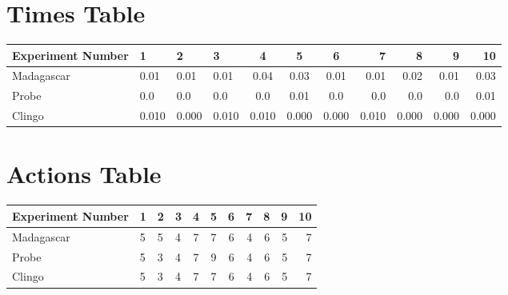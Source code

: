 \documentclass[8pt]{article}
\begin{document}
\begin{landscape}
\section{Times Table}\begin{tabular}{ | l | l | l | l | c | c | c | r | r | r | r | }\hline
Experiment Number & 1 & 2 & 3 & 4 & 5 & 6 & 7 & 8 & 9 & 10\\  \hline
Madagascar & 0.01 & 0.01 & 0.01 & 0.04 & 0.03 & 0.01 & 0.01 & 0.02 & 0.01 & 0.03\\  \hline
Probe & 0.0 & 0.0 & 0.0 & 0.0 & 0.01 & 0.0 & 0.0 & 0.0 & 0.0 & 0.01\\  \hline
Clingo & 0.010 & 0.000 & 0.010 & 0.010 & 0.000 & 0.000 & 0.010 & 0.000 & 0.000 & 0.000\\  \hline
\end{tabular}
\section{Actions Table}\begin{tabular}{ | l | l | l | l | c | c | c | r | r | r | r | }\hline
Experiment Number & 1 & 2 & 3 & 4 & 5 & 6 & 7 & 8 & 9 & 10\\ \hline
 Madagascar & 5 & 5 & 4 & 7 & 7 & 6 & 4 & 6 & 5 & 7\\ \hline
 Probe & 5 & 3 & 4 & 7 & 9 & 6 & 4 & 6 & 5 & 7\\ \hline
 Clingo & 5 & 3 & 4 & 7 & 7 & 6 & 4 & 6 & 5 & 7\\ \hline
\end{tabular}
\end{landscape}
\end{document}
